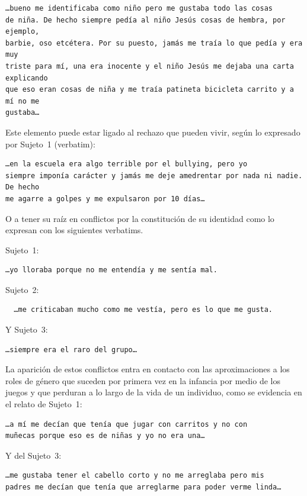 \begin{verbatim}
…bueno me identificaba como niño pero me gustaba todo las cosas
de niña. De hecho siempre pedía al niño Jesús cosas de hembra, por ejemplo,
barbie, oso etcétera. Por su puesto, jamás me traía lo que pedía y era muy
triste para mí, una era inocente y el niño Jesús me dejaba una carta explicando
que eso eran cosas de niña y me traía patineta bicicleta carrito y a mí no me
gustaba…
\end{verbatim}

Este elemento puede estar ligado al rechazo que pueden vivir, según lo expresado
por Sujeto~1 (verbatim):

\begin{verbatim}
…en la escuela era algo terrible por el bullying, pero yo
siempre imponía carácter y jamás me deje amedrentar por nada ni nadie. De hecho
me agarre a golpes y me expulsaron por 10 días…
\end{verbatim}

O a tener su raíz en conflictos por la constitución de su identidad como lo
expresan con los siguientes verbatims.

Sujeto~1:
\begin{verbatim}
…yo lloraba porque no me entendía y me sentía mal.
\end{verbatim}

Sujeto~2:

\begin{verbatim}
  …me criticaban mucho como me vestía, pero es lo que me gusta.
\end{verbatim}

Y Sujeto~3:

\begin{verbatim}
…siempre era el raro del grupo…
\end{verbatim}

La aparición de estos conflictos entra en contacto con las aproximaciones a los
roles de género que suceden por primera vez en la infancia por medio de los
juegos y que perduran a lo largo de la vida de un individuo, como se evidencia
en el relato de Sujeto~1:

\begin{verbatim}
…a mí me decían que tenía que jugar con carritos y no con
muñecas porque eso es de niñas y yo no era una…
\end{verbatim}

Y del Sujeto~3:

\begin{verbatim}
…me gustaba tener el cabello corto y no me arreglaba pero mis
padres me decían que tenía que arreglarme para poder verme linda…
\end{verbatim}

